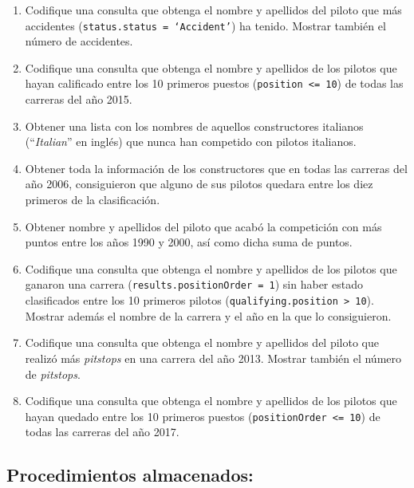 \documentclass{db-practice}
\begin{document}
\begin{enumerate}
    \item Codifique una consulta que obtenga el nombre y apellidos del piloto que más accidentes (\texttt{status.status = `Accident'}) ha tenido. Mostrar también el número de accidentes.
            
    \item Codifique una consulta que obtenga el nombre y apellidos de los pilotos que hayan calificado entre los 10 primeros puestos (\texttt{position <= 10}) de todas las carreras del año 2015.
    
    \item Obtener una lista con los nombres de aquellos constructores italianos (``\textit{Italian}'' en inglés) que nunca han competido con pilotos italianos.
    
    \item Obtener toda la información de los constructores que en todas las carreras del año 2006, consiguieron que alguno de sus pilotos quedara entre los diez primeros de la clasificación.
    
    \item Obtener nombre y apellidos del piloto que acabó la competición con más puntos entre los años 1990 y 2000, así como dicha suma de puntos.

    \item Codifique una consulta que obtenga el nombre y apellidos de los pilotos que ganaron una carrera (\texttt{results.positionOrder = 1}) sin haber estado clasificados entre los 10 primeros pilotos (\texttt{qualifying.position > 10}). Mostrar además el nombre de la carrera y el año en la que lo consiguieron.

    \item Codifique una consulta que obtenga el nombre y apellidos del piloto que realizó más \emph{pitstops} en una carrera del año 2013. Mostrar también el número de \emph{pitstops}.
    
    \item Codifique una consulta que obtenga el nombre y apellidos de los pilotos que hayan quedado entre los 10 primeros puestos (\texttt{positionOrder <= 10}) de todas las carreras del año 2017.
\end{enumerate}

\subsection*{Procedimientos almacenados:}
\end{document}
